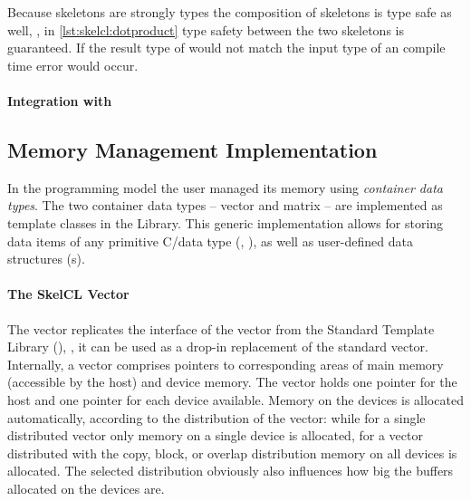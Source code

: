 Because skeletons are strongly types the composition of skeletons is type safe as well, \ie, in \autoref{lst:skelcl:dotproduct} type safety between the two skeletons is guaranteed.
If the result type of  would not match the input type of  an compile time error would occur.

\paragraph{Integration with \Cpp}


\subsection{Memory Management Implementation}
\label{section:skelcl-library:memory-management}
In the \SkelCL programming model the user managed its memory using \emph{container data types}.
The two container data types -- vector and matrix -- are implemented as template classes in the \SkelCL Library.
This generic implementation allows for storing data items of any primitive C/\Cpp data type (\eg, ), as well as user-defined data structures (s).

\paragraph{The SkelCL Vector}
The \SkelCL vector replicates the interface of the vector from the Standard Template Library (\STL), \ie, it can be used as a drop-in replacement of the standard vector.
Internally, a vector comprises pointers to corresponding areas of main memory (accessible by the host) and device memory.
The vector holds one pointer for the host and one pointer for each device available.
Memory on the devices is allocated automatically, according to the distribution of the vector:
while for a single distributed vector only memory on a single device is allocated, for a vector distributed with the copy, block, or overlap distribution memory on all devices is allocated.
The selected distribution obviously also influences how big the buffers allocated on the devices are.

